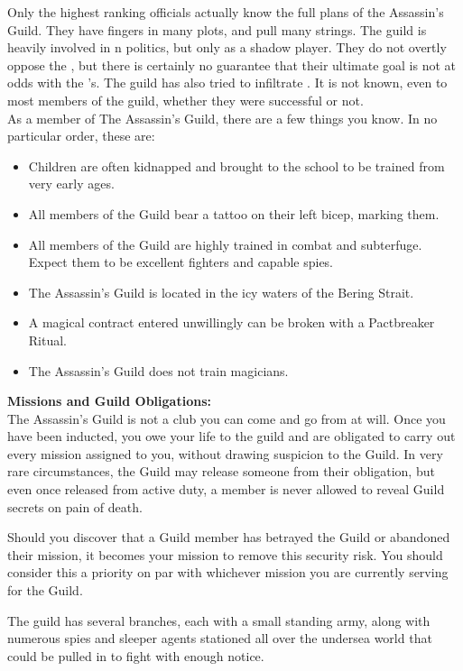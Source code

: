 \documentclass[blue]{NeptuneBall}
\begin{document}
\name{\bAssassin{}}

Only the highest ranking officials actually know the full plans of the Assassin's Guild. They have fingers in many plots, and pull many strings. The guild is heavily involved in \pPacifica{}n politics, but only as a shadow player.  They do not overtly oppose the \cPacificanRuler{\King}, but there is certainly no guarantee that their ultimate goal is not at odds with the \cPacificanRuler{\King}'s. The guild has also tried to infiltrate \pAtlantis{}. It is not known, even to most members of the guild, whether they were successful or not.\\

As a member of The Assassin's Guild, there are a few things you know. In no particular order, these are:

\begin{itemize}
  \item Children are often kidnapped and brought to the school to be trained from very early ages.
  \item All members of the Guild bear a tattoo on their left bicep, marking them.
  \item All members of the Guild are highly trained in combat and subterfuge. Expect them to be excellent fighters and capable spies.
  \item The Assassin's Guild is located in the icy waters of the Bering Strait.
	\item A magical contract entered unwillingly can be broken with a Pactbreaker Ritual.
  \item The Assassin's Guild does not train magicians.\\
\end{itemize}

{\bf Missions and Guild Obligations:}\\
The Assassin's Guild is not a club you can come and go from at will. Once you have been inducted, you owe your life to the guild and are obligated to carry out every mission assigned to you, without drawing suspicion to the Guild. In very rare circumstances, the Guild may release someone from their obligation, but even once released from active duty, a member is never allowed to reveal Guild secrets on pain of death.

Should you discover that a Guild member has betrayed the Guild or abandoned their mission, it becomes your mission to remove this security risk. You should consider this a priority on par with whichever mission you are currently serving for the Guild.

\begin{itemz}[Trivia]
	\item The guild has several branches, each with a small standing army, along with numerous spies and sleeper agents stationed all over the undersea world that could be pulled in to fight with enough notice.
\end{itemz}
\end{document}
